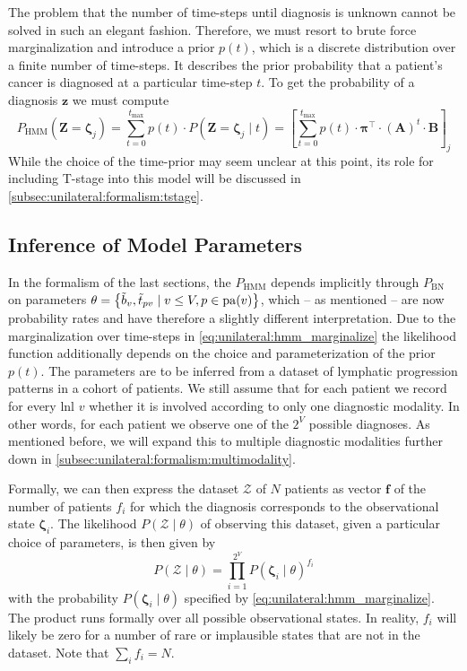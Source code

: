 \documentclass[\relativeRoot/main.tex]{subfiles}
\begin{document}
The problem that the number of time-steps until diagnosis is unknown cannot be solved in such an elegant fashion. Therefore, we must resort to brute force marginalization and introduce a prior $p(t)$, which is a discrete distribution over a finite number of time-steps. It describes the prior probability that a patient's cancer is diagnosed at a particular time-step $t$. To get the probability of a diagnosis $\mathbf{z}$ we must compute
%
\begin{equation} \label{eq:unilateral:hmm_marginalize}
    P_\text{HMM} \left( \mathbf{Z} = \boldsymbol{\zeta}_j \right) = \sum_{t = 0}^{t_\text{max}}{p(t) \cdot P\left( \mathbf{Z} = \boldsymbol{\zeta}_j \mid t \right)} = \left[ \sum_{t = 0}^{t_\text{max}}{p(t) \cdot \boldsymbol{\pi}^\top \cdot (\mathbf{A})^t \cdot \mathbf{B}} \right]_j
\end{equation}
%
While the choice of the time-prior may seem unclear at this point, its role for including T-stage into this model will be discussed in \cref{subsec:unilateral:formalism:tstage}.

\subsection{Inference of Model Parameters}
\label{subsec:unilateral:formalism:inference}

In the formalism of the last sections, the $P_\text{HMM}$ depends implicitly through $P_\text{BN}$ on parameters $\theta = \left\{ \Tilde{b}_v , \Tilde{t}_{pv} \mid v \leq V , p \in \operatorname{pa}(v) \right\}$, which -- as mentioned -- are now probability rates and have therefore a slightly different interpretation. Due to the marginalization over time-steps in \cref{eq:unilateral:hmm_marginalize} the likelihood function additionally depends on the choice and parameterization of the prior $p(t)$. The parameters are to be inferred from a dataset of lymphatic progression patterns in a cohort of patients. We still assume that for each patient we record for every \gls{lnl} $v$ whether it is involved according to only one diagnostic modality. In other words, for each patient we observe one of the $2^V$ possible diagnoses. As mentioned before, we will expand this to multiple diagnostic modalities further down in \cref{subsec:unilateral:formalism:multimodality}.

Formally, we can then express the dataset $\boldsymbol{\mathcal{Z}}$ of $N$ patients as vector $\mathbf{f}$ of the number of patients $f_i$ for which the diagnosis corresponds to the observational state $\boldsymbol{\zeta}_i$. The likelihood $P \left( \boldsymbol{\mathcal{Z}} \mid \theta \right)$ of observing this dataset, given a particular choice of parameters, is then given by
%
\begin{equation}
    P \left( \boldsymbol{\mathcal{Z}} \mid \theta \right) = \prod_{i=1}^{2^V}{P \left( \boldsymbol{\zeta}_i \mid \theta \right)^{f_i}}
\end{equation}
%
with the probability $P \left( \boldsymbol{\zeta}_i \mid \theta \right)$ specified by \cref{eq:unilateral:hmm_marginalize}. The product runs formally over all possible observational states. In reality, $f_i$ will likely be zero for a number of rare or implausible states that are not in the dataset. Note that $\sum_{i}{f_i} = N$.
\end{document}
